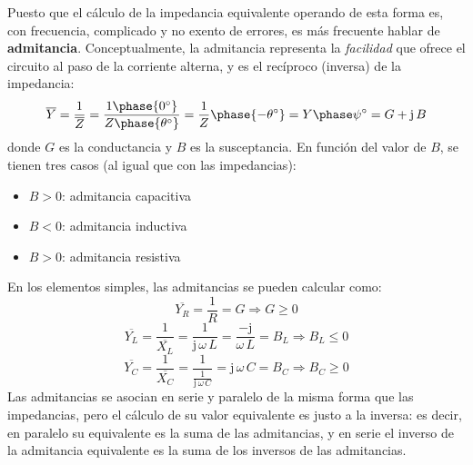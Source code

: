 \documentclass[11pt]{book} %
\numberwithin{dummy}{section}
\theoremstyle{ocrenumbox}
\theoremstyle{blacknumex}
\theoremstyle{blacknumbox}
\theoremstyle{ocrenum}
\begin{document}
	Puesto que el cálculo de la impedancia equivalente operando de esta forma es, con frecuencia, complicado y no exento de errores, es más frecuente hablar de \textbf{admitancia}. Conceptualmente, la admitancia representa la \textit{facilidad} que ofrece el circuito al paso de la corriente alterna, y es el recíproco (inversa) de la impedancia: 
	\begin{equation*}
	    \overline{Y}=\dfrac{1}{\overline{Z}}=\dfrac{1\phase{0^\circ}}{Z\phase{\theta^\circ}}=\dfrac{1}{Z}\phase{-\theta^\circ}=Y\phase\psi^\circ=G+\mathrm{j}\,B
	\end{equation*}
	donde $G$ es la conductancia y $B$ es la susceptancia. En función del valor de $B$, se tienen tres casos (al igual que con las impedancias):
	\begin{itemize}
		\item $B>0$: admitancia capacitiva
		\item $B<0$: admitancia inductiva
		\item $B>0$: admitancia resistiva
	\end{itemize}
	En los elementos simples, las admitancias se pueden calcular como: 
	\begin{equation}
		\boxed{\overline{Y_R}=\dfrac{1}{R}=G}\Rightarrow G\geq 0
	\end{equation}
	\begin{equation}
		\boxed{\overline{Y_L}=\dfrac{1}{\overline{X_L}}=\dfrac{1}{\mathrm{j}\,\omega\,L}=\dfrac{-\mathrm{j}}{\omega\,L}=B_L}\Rightarrow B_L\leq 0
	\end{equation}
	\begin{equation}
		\boxed{\overline{Y_C}=\dfrac{1}{\overline{X_C}}=\dfrac{1}{\frac{1}{\mathrm{j}\,\omega\,C}}=\mathrm{j}\,\omega\,C=B_C}\Rightarrow B_C\geq 0
	\end{equation}
	Las admitancias se asocian en serie y paralelo de la misma forma que las impedancias, pero el cálculo de su valor equivalente es justo a la inversa: es decir, en paralelo su equivalente es la suma de las admitancias, y en serie el inverso de la admitancia equivalente es la suma de los inversos de las admitancias.
	
\end{document}
